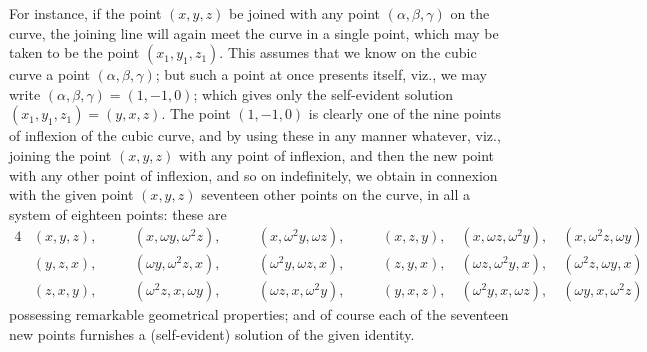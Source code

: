 \documentclass[11pt,a4paper]{article}
\begin{document}
For instance, if the point $(x, y, z)$ be joined with any point $(\alpha, \beta, \gamma)$ on the curve,
the joining line will again meet the curve in a single point, which may be taken to
be the point $(x_1, y_1, z_1)$. This assumes that we know on the cubic curve a point
$(\alpha, \beta, \gamma)$; but such a point at once presents itself, viz., we may write $(\alpha, \beta, \gamma) = (1, -1, 0)$;
which gives only the self-evident solution $(x_1, y_1, z_1) = (y, x, z)$. The point $(1, -1, 0)$
is clearly one of the nine points of inflexion of the cubic curve, and by using these
in any manner whatever, viz., joining the point $(x, y, z)$ with any point of inflexion,
and then the new point with any other point of inflexion, and so on indefinitely, we
obtain in connexion with the given point $(x, y, z)$ seventeen other points on the curve,
in all a system of eighteen points: these are
\begin{alignat*}{4}
&(x, y, z), \quad &&(x, \omega y, \omega^2z), \quad &&(x, \omega^2y, \omega z), \quad &&(x, z, y), \quad (x, \omega z, \omega^2y), \quad (x, \omega^2z, \omega y)\\
&(y, z, x), \quad &&(\omega y, \omega^2z, x), \quad &&(\omega^2y, \omega z, x), \quad &&(z, y, x), \quad (\omega z, \omega^2y, x), \quad (\omega^2z, \omega y, x)\\
&(z, x, y), \quad &&(\omega^2z, x, \omega y), \quad &&(\omega z, x, \omega^2y), \quad &&(y, x, z), \quad (\omega^2y, x, \omega z), \quad (\omega y, x, \omega^2z)
\end{alignat*}
possessing remarkable geometrical properties; and of course each of the seventeen new
points furnishes a (self-evident) solution of the given identity.
\end{document}
